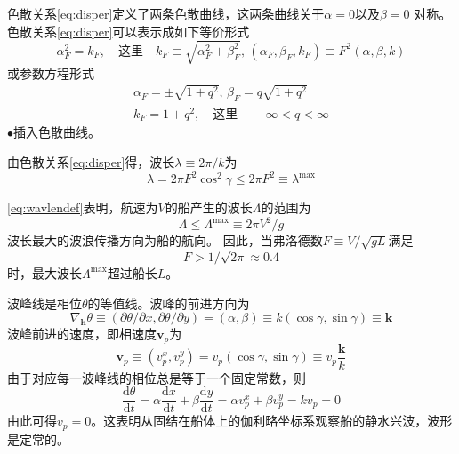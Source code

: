 色散关系\eqref{eq:disper}定义了两条色散曲线，这两条曲线关于$\alpha=0$以及$\beta=0$
对称。色散关系\eqref{eq:disper}可以表示成如下等价形式
\begin{equation}
  \alpha^2_F=k_F,\quad\text{这里}\quad k_F\equiv\sqrt{\alpha^2_F+\beta^2_F}
  ,\,(\alpha_F,\beta_F,k_F)\equiv F^2(\alpha,\beta,k)
  \label{eq:disper1}
\end{equation}
或参数方程形式
\begin{equation}
  \begin{array}{l}
    \alpha_F=\pm\sqrt{1+q^2},\,\beta_F=q\sqrt{1+q^2}\\
    k_F=1+q^2,\quad\text{这里}\quad -\infty<q<\infty
  \end{array}
  \label{eq:disper2}
\end{equation}
$\bullet$插入色散曲线。

由色散关系\eqref{eq:disper}得，波长$\lambda\equiv 2\pi/k$为
\begin{equation}
  \lambda=2\pi F^2\cos^2\gamma\le2\pi F^2\equiv \lambda^{\max}
  \label{eq:wavlendef}
\end{equation}

\eqref{eq:wavlendef}表明，航速为$V$的船产生的波长$\Lambda$的范围为
\begin{equation}
  \Lambda\le\Lambda^{\max}\equiv2\pi V^2/g
  \label{eq:Wavlen}
\end{equation}
波长最大的波浪传播方向为船的航向。
因此，当弗洛德数$F\equiv V/\sqrt{gL}$满足
\begin{equation}
  F>1/\sqrt{2\pi}\approx0.4
  \label{eq:hullspd}
\end{equation}
时，最大波长$\Lambda^{\max}$超过船长$L$。

波峰线是相位$\theta$的等值线。波峰的前进方向为
\begin{equation}
  \nabla_{\mathbf{h}}\theta\equiv(\partial\theta/\partial x,\partial\theta/\partial y)=(\alpha,\beta)\equiv k(\cos\gamma,\sin\gamma)\equiv\mathbf{k}
  \label{eq:dtheta}
\end{equation}
波峰前进的速度，即相速度$\mathbf{v}_p$为
\begin{equation}
  \mathbf{v}_p\equiv(v_p^x,v_p^y)=v_p(\cos\gamma,\sin\gamma)\equiv 
  v_p\frac{\mathbf{k}}{k}
  \label{eq:vp}
\end{equation}
由于对应每一波峰线的相位总是等于一个固定常数，则
\begin{equation}
  \frac{\mathrm{d}\theta}{\mathrm{d}t}=\alpha\frac{\mathrm{d}x}{\mathrm{d}t}
  +\beta\frac{\mathrm{d}y}{\mathrm{d}t}=\alpha v_p^x+\beta v_p^y=kv_p=0
  \label{eq:dthetadt}
\end{equation}
由此可得$v_p=0$。这表明从固结在船体上的伽利略坐标系观察船的静水兴波，波形是定常的。

